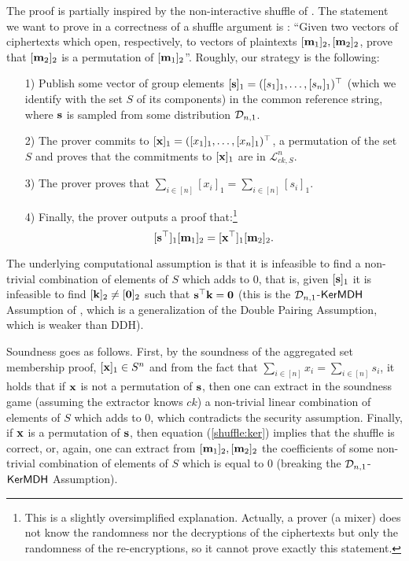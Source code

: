 The proof is partially inspired by the non-interactive shuffle of \cite{AC:GroLu07}. The statement we want to prove in a correctness of a shuffle argument is : ``Given two vectors of ciphertexts which open, respectively, to vectors of plaintexts $[\mathbf{m}_1]_2, [\mathbf{m}_2]_2$, prove that 
 $[\mathbf{m}_2]_2$ is a permutation of $[\mathbf{m}_1]_2$''.  Roughly, our strategy is the following:  
\begin{itemize}
\item[1)] Publish some vector of group elements $[\mathbf{s}]_1 =([s_1]_1,\ldots,[s_n]_1)^\top$ (which we identify with the set $S$ of its components) in the common reference string, where $\mathbf{s}$ is sampled from some distribution $\mathcal{D}_{n,1}$.
\item[2)] The prover commits to $[\mathbf{x}]_1=([x_1]_1,\ldots,[x_n]_1)^\top$, a permutation of the set $S$ and proves that the commitments to $[\mathbf{x}]_1$ are in $\mathcal{L}^{n}_{ck,S}$.
\item[3)] The prover proves that $\sum_{i \in [n]} [x_i]_1 =\sum_{i \in [n]} [s_i]_1$.
\item[4)] Finally, the prover outputs a proof that:\footnote{This is a slightly oversimplified explanation. 
Actually, a prover (a mixer) does not know the randomness nor the decryptions of the ciphertexts but only the randomness of the re-encryptions, so it cannot prove exactly this statement.} 
\begin{equation}\label{shuffle:ker}[\mathbf{s}^{\top}]_1 [\mathbf{m}_1]_2 =[\mathbf{x}^{\top}]_1 [\mathbf{m}_2]_2.
\end{equation}
\end{itemize}
The underlying computational assumption is that it is infeasible to find a non-trivial combination of elements of $S$ which adds to $0$, that is, given $[\mathbf{s}]_1$ it is infeasible to find $[\mathbf{k}]_2 \neq [\mathbf{0}]_2$ such that
$\mathbf{s}^{\top} \mathbf{k}=\mathbf{0}$ (this is the $\mathcal{D}_{n,1}$-$\mathsf{KerMDH}$ Assumption of \cite{EPRINT:MorRafVil15}, which is a generalization of the Double Pairing Assumption, which is weaker than DDH). 

Soundness goes as follows. First, by the soundness of the aggregated set membership proof, $[\mathbf{x}]_1 \in S^{n}$ and from the fact that 
 $\sum_{i \in [n]} x_i =\sum_{i \in [n]} s_i$, it holds that if 
 $\mathbf{x}$ is not a permutation of $\mathbf{s}$, then one can extract in the soundness game (assuming the extractor knows $ck$) a non-trivial linear combination of elements of $S$ which adds to $0$, which contradicts the security assumption. 
Finally, if $\mathbf{x}$ is a permutation of $\mathbf{s}$,  then equation (\ref{shuffle:ker}) implies that the shuffle is correct, or, again, 
one can extract from   $[\mathbf{m}_1]_2,[\mathbf{m}_2]_2$ the coefficients of some non-trivial combination of elements of $S$ which is equal to $0$ (breaking the $\mathcal{D}_{n,1}$-$\mathsf{KerMDH}$ Assumption). 

